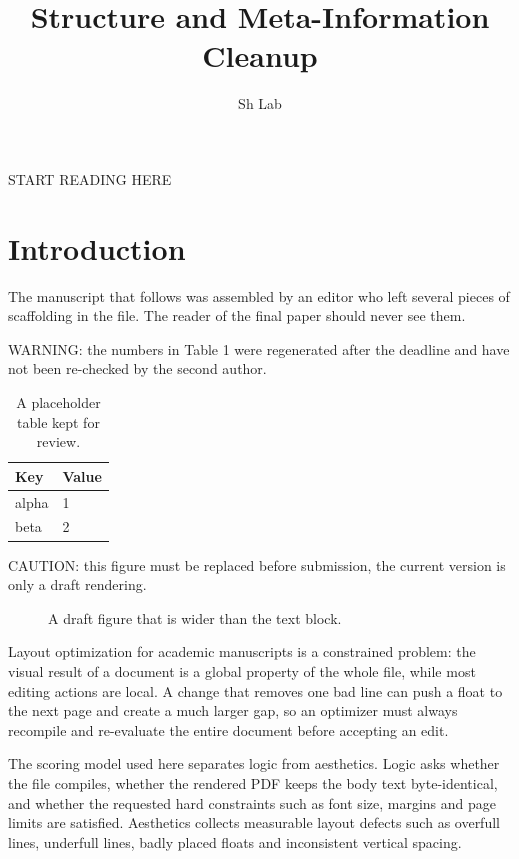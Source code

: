 \documentclass[10pt,a4paper]{article}
\title{Structure and Meta-Information Cleanup}
\author{Sh Lab}
\date{}
\begin{document}
\maketitle

START READING HERE

\section{Introduction}
The manuscript that follows was assembled by an editor who left several pieces
of scaffolding in the file. The reader of the final paper should never see them.

WARNING: the numbers in Table 1 were regenerated after the deadline and have not
been re-checked by the second author.

\begin{table}[tbp]\centering
\caption{A placeholder table kept for review.}
\begin{tabular}{ll}\toprule Key & Value \\\midrule alpha & 1 \\ beta & 2 \\\bottomrule
\end{tabular}
\end{table}

CAUTION: this figure must be replaced before submission, the current version is
only a draft rendering.

\begin{figure}[tbp]\centering
{}
\caption{A draft figure that is wider than the text block.}
\end{figure}
Layout optimization for academic manuscripts is a constrained problem: the visual result of a document is a global property of the whole file, while most editing actions are local. A change that removes one bad line can push a float to the next page and create a much larger gap, so an optimizer must always recompile and re-evaluate the entire document before accepting an edit.

The scoring model used here separates logic from aesthetics. Logic asks whether the file compiles, whether the rendered PDF keeps the body text byte-identical, and whether the requested hard constraints such as font size, margins and page limits are satisfied. Aesthetics collects measurable layout defects such as overfull lines, underfull lines, badly placed floats and inconsistent vertical spacing.
\end{document}
